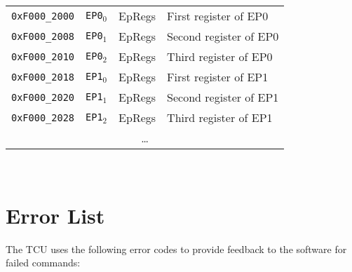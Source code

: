 \begin{tabular}{ p{3cm} | c | c | l }
  \hline
  \hline
  \texttt{0xF000\_2000} & \texttt{EP0$_0$} & EpRegs & First register of EP0 \\
  \texttt{0xF000\_2008} & \texttt{EP0$_1$} & EpRegs & Second register of EP0 \\
  \texttt{0xF000\_2010} & \texttt{EP0$_2$} & EpRegs & Third register of EP0 \\
  \hline
  \texttt{0xF000\_2018} & \texttt{EP1$_0$} & EpRegs & First register of EP1 \\
  \texttt{0xF000\_2020} & \texttt{EP1$_1$} & EpRegs & Second register of EP1 \\
  \texttt{0xF000\_2028} & \texttt{EP1$_2$} & EpRegs & Third register of EP1 \\
  \hline
  \multicolumn{4}{c}{\dots} \\
  \hline
  \hline
\end{tabular}\\[1em]

\section{Error List}

The TCU uses the following error codes to provide feedback to the software for failed commands:

